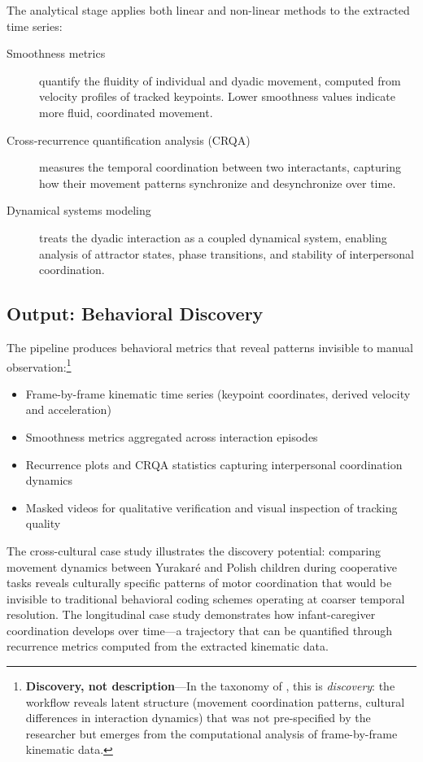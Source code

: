 \documentclass[../main.tex]{subfiles}
\begin{document}
The analytical stage applies both linear and non-linear methods to the extracted time series:

\begin{description}
    \item[Smoothness metrics] quantify the fluidity of individual and dyadic movement, computed from velocity profiles of tracked keypoints. Lower smoothness values indicate more fluid, coordinated movement.
    \item[Cross-recurrence quantification analysis (CRQA)] measures the temporal coordination between two interactants, capturing how their movement patterns synchronize and desynchronize over time.
    \item[Dynamical systems modeling] treats the dyadic interaction as a coupled dynamical system, enabling analysis of attractor states, phase transitions, and stability of interpersonal coordination.
\end{description}

\subsection{Output: Behavioral Discovery}

The pipeline produces behavioral metrics that reveal patterns invisible to manual observation:\footnote{\textbf{Discovery, not description}---In the taxonomy of \textcite{grimmer2021machine}, this is \textit{discovery}: the workflow reveals latent structure (movement coordination patterns, cultural differences in interaction dynamics) that was not pre-specified by the researcher but emerges from the computational analysis of frame-by-frame kinematic data.}

\begin{itemize}
    \item Frame-by-frame kinematic time series (keypoint coordinates, derived velocity and acceleration)
    \item Smoothness metrics aggregated across interaction episodes
    \item Recurrence plots and CRQA statistics capturing interpersonal coordination dynamics
    \item Masked videos for qualitative verification and visual inspection of tracking quality
\end{itemize}

The cross-cultural case study illustrates the discovery potential: comparing movement dynamics between Yurakar\'{e} and Polish children during cooperative tasks reveals culturally specific patterns of motor coordination that would be invisible to traditional behavioral coding schemes operating at coarser temporal resolution. The longitudinal case study demonstrates how infant-caregiver coordination develops over time---a trajectory that can be quantified through recurrence metrics computed from the extracted kinematic data.
\end{document}
